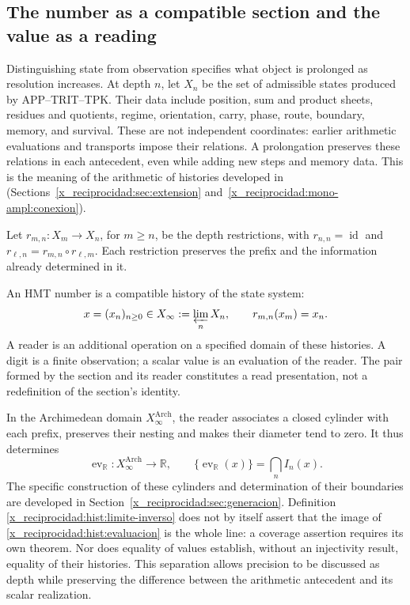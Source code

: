 \subsection{The number as a compatible section and the value as a reading}
\label{x_reciprocidad:hist:seccion}

Distinguishing state from observation specifies what object is prolonged
as resolution increases. At depth \(n\), let \(X_n\) be the set of
admissible states produced by APP--TRIT--TPK. Their data include position,
sum and product sheets, residues and quotients, regime, orientation,
carry, phase, route, boundary, memory, and survival. These are not
independent coordinates: earlier arithmetic evaluations and transports
impose their relations. A prolongation preserves these relations in
each antecedent, even while adding new steps and memory data.
This is the meaning of the arithmetic of histories developed in
(Sections~\ref{x_reciprocidad:sec:extension} and~\ref{x_reciprocidad:mono-ampl:conexion}).

Let \(r_{m,n}:X_m\to X_n\), for \(m\geq n\), be the depth
restrictions, with \(r_{n,n}=\operatorname{id}\) and
\(r_{\ell,n}=r_{m,n}\circ r_{\ell,m}\). Each restriction preserves the
prefix and the information already determined in it.

\begin{definition}
An HMT number is a compatible history of the state system:
\begin{equation}
 x=(x_n)_{n\geq0}\in X_\infty:=\varprojlim_n X_n,
 \qquad r_{m,n}(x_m)=x_n.
 \label{x_reciprocidad:hist:limite-inverso}
\end{equation}
A reader is an additional operation on a specified domain of these
histories. A digit is a finite observation; a scalar value is an
evaluation of the reader. The pair formed by the section and its reader constitutes
a read presentation, not a redefinition of the section's identity.
\end{definition}

In the Archimedean domain \(X_\infty^{\mathrm{Arch}}\), the reader associates
a closed cylinder with each prefix, preserves their nesting and makes
their diameter tend to zero. It thus determines
\begin{equation}
 \operatorname{ev}_{\mathbb R}:X_\infty^{\mathrm{Arch}}\longrightarrow
 \mathbb R,\qquad
 \{\operatorname{ev}_{\mathbb R}(x)\}=\bigcap_n I_n(x).
 \label{x_reciprocidad:hist:evaluacion}
\end{equation}
The specific construction of these cylinders and determination of their boundaries
are developed in Section~\ref{x_reciprocidad:sec:generacion}. Definition
\eqref{x_reciprocidad:hist:limite-inverso} does not by itself assert that the image of
\eqref{x_reciprocidad:hist:evaluacion} is the whole line: a coverage assertion
requires its own theorem. Nor does equality of values establish,
without an injectivity result, equality of their histories. This separation
allows precision to be discussed as depth while preserving the difference
between the arithmetic antecedent and its scalar realization.

